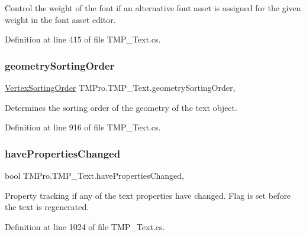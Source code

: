 Control the weight of the font if an alternative font asset is assigned for the given weight in the font asset editor. 



Definition at line 415 of file T\+M\+P\+\_\+\+Text.\+cs.

\mbox{\label{class_t_m_pro_1_1_t_m_p___text_af3c95939c35cbe809cf749ea7c879251}} 
\subsubsection{\texorpdfstring{geometrySortingOrder}{geometrySortingOrder}}
{\footnotesize\ttfamily \mbox{\hyperlink{namespace_t_m_pro_a29c2b2e41c29850d1bc0760ac64b1ee0}{Vertex\+Sorting\+Order}} T\+M\+Pro.\+T\+M\+P\+\_\+\+Text.\+geometry\+Sorting\+Order\hspace{0.3cm}{\ttfamily [get]}, {\ttfamily [set]}}



Determines the sorting order of the geometry of the text object. 



Definition at line 916 of file T\+M\+P\+\_\+\+Text.\+cs.

\mbox{\label{class_t_m_pro_1_1_t_m_p___text_a7e0fb1ed735ea717f9b98373b9de6e73}} 
\subsubsection{\texorpdfstring{havePropertiesChanged}{havePropertiesChanged}}
{\footnotesize\ttfamily bool T\+M\+Pro.\+T\+M\+P\+\_\+\+Text.\+have\+Properties\+Changed\hspace{0.3cm}{\ttfamily [get]}, {\ttfamily [set]}}



Property tracking if any of the text properties have changed. Flag is set before the text is regenerated. 



Definition at line 1024 of file T\+M\+P\+\_\+\+Text.\+cs.

\mbox{\label{class_t_m_pro_1_1_t_m_p___text_ae63cc778cd7e6deeee029bcec94fd674}} 
